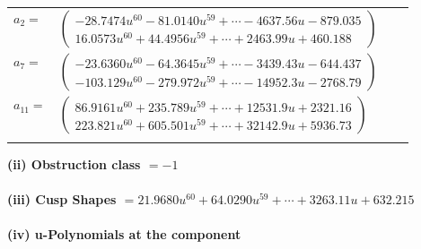 \documentclass[1p]{elsarticle_modified}
\theoremstyle{definition}
\begin{document}
\begin{tabular}{m{7pt} m{180pt} m{7pt} m{180pt} }
\flushright $a_{2}=$&$\begin{pmatrix}-28.7474 u^{60}-81.0140 u^{59}+\cdots-4637.56 u-879.035\\16.0573 u^{60}+44.4956 u^{59}+\cdots+2463.99 u+460.188\end{pmatrix}$ \\
\flushright $a_{7}=$&$\begin{pmatrix}-23.6360 u^{60}-64.3645 u^{59}+\cdots-3439.43 u-644.437\\-103.129 u^{60}-279.972 u^{59}+\cdots-14952.3 u-2768.79\end{pmatrix}$ \\
\flushright $a_{11}=$&$\begin{pmatrix}86.9161 u^{60}+235.789 u^{59}+\cdots+12531.9 u+2321.16\\223.821 u^{60}+605.501 u^{59}+\cdots+32142.9 u+5936.73\end{pmatrix}$\\&\end{tabular}
\flushleft \textbf{(ii) Obstruction class $= -1$}\\~\\
\flushleft \textbf{(iii) Cusp Shapes $= 21.9680 u^{60}+64.0290 u^{59}+\cdots+3263.11 u+632.215$}\\~\\
\newpage\renewcommand{\arraystretch}{1}
\flushleft \textbf{(iv) u-Polynomials at the component}\newline \\
\end{document}
